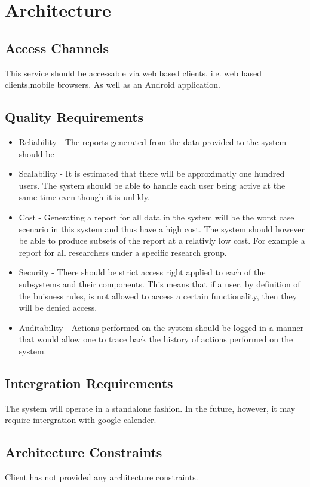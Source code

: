 \documentclass{article}
\begin{document}
	\section{Architecture}
	\subsection{Access Channels}
	This service should be accessable via web based clients. i.e. web based clients,mobile browsers. As well as an Android application.

	\subsection{Quality Requirements}
	\begin{itemize}
	  \item Reliability - The reports generated from the data provided to the system should be
	  \item Scalability - It is estimated that there will be approximatly one hundred users. The system should be able to handle each user being active at the same time even though it is unlikly.
	  \item Cost - Generating a report for all data in the system will be the worst case scenario in this system and thus have a high cost. The system should however be able to produce subsets of the report at a relativly low cost. For example a report for all researchers under a specific research group.
	  \item Security - There should be strict access right applied to each of the subsystems and their components. This means that if a user, by definition of the buisness rules, is not allowed to access a certain functionality, then they will be denied access.
	  \item Auditability - Actions performed on the system should be logged in a manner that would allow one to trace back the history of actions performed on the system.
	\end{itemize}

	\subsection{Intergration Requirements}
	The system will operate in a standalone fashion. In the future, however, it may require intergration with google calender.

	\subsection{Architecture Constraints}
	Client has not provided any architecture constraints.
	
\end{document}
